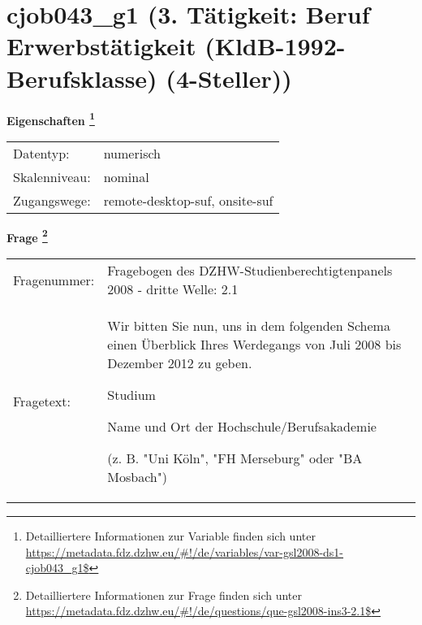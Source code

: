 
    \setcounter{footnote}{0}

    \vspace*{-1.8cm}
	\section{cjob043\_g1 (3. Tätigkeit: Beruf Erwerbstätigkeit (KldB-1992-Berufsklasse) (4-Steller))}
	\label{section:cjob043_g1}



    \vspace*{0.5cm}
    \noindent\textbf{Eigenschaften
	\footnote{Detailliertere Informationen zur Variable finden sich unter
		\url{https://metadata.fdz.dzhw.eu/\#!/de/variables/var-gsl2008-ds1-cjob043_g1$}}}\\
	\begin{tabularx}{\hsize}{@{}lX}
	Datentyp: & numerisch \\
	Skalenniveau: & nominal \\
	Zugangswege: &
	  remote-desktop-suf, 
	  onsite-suf
 \\
    \end{tabularx}



				\vspace*{0.5cm}
                \noindent\textbf{Frage
	                \footnote{Detailliertere Informationen zur Frage finden sich unter
		              \url{https://metadata.fdz.dzhw.eu/\#!/de/questions/que-gsl2008-ins3-2.1$}}}\\
				\begin{tabularx}{\hsize}{@{}lX}
					Fragenummer: &
					  Fragebogen des DZHW-Studienberechtigtenpanels 2008 - dritte Welle:
					  2.1
 \\
					Fragetext: & Wir bitten Sie nun, uns in dem folgenden Schema einen Überblick Ihres Werdegangs von Juli 2008 bis Dezember 2012 zu geben.\par  Studium\par  Name und Ort der Hochschule/Berufsakademie\par  (z. B. "Uni Köln", "FH Merseburg" oder "BA Mosbach") \\
				\end{tabularx}





